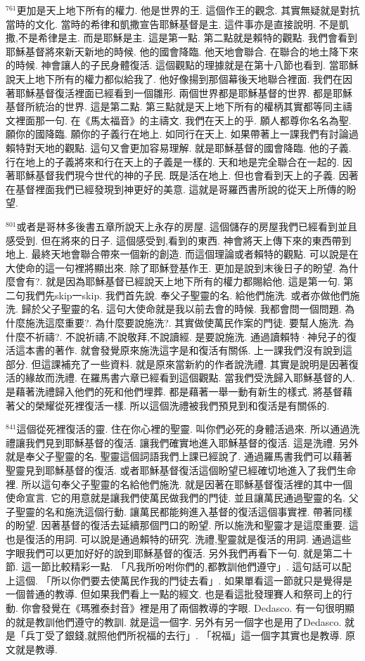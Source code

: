 \documentclass{book}
\begin{document}
$^{761}$更加是天上地下所有的權力.
他是世界的王.
這個作王的觀念.
其實無疑就是對抗當時的文化.
當時的希律和凱撒宣告耶穌基督是主.
這件事亦是直接說明.
不是凱撒,不是希律是主.
而是耶穌是主.
這是第一點.
第二點就是賴特的觀點.
我們會看到耶穌基督將來新天新地的時候.
他的國會降臨.
他天地會聯合.
在聯合的地土降下來的時候.
神會讓人的子民身體復活.
這個觀點的理據就是在第十八節也看到.
當耶穌說天上地下所有的權力都似給我了.
他好像揚到那個幕後天地聯合裡面.
我們在因著耶穌基督復活裡面已經看到一個雛形.
兩個世界都是耶穌基督的世界.
都是耶穌基督所統治的世界.
這是第二點.
第三點就是天上地下所有的權柄其實都等同主禱文裡面那一句.
在《馬太福音》的主禱文.
我們在天上的乎.
願人都尊你名名為聖.
願你的國降臨.
願你的子義行在地上.
如同行在天上.
如果帶著上一課我們有討論過賴特對天地的觀點.
這句又會更加容易理解.
就是耶穌基督的國會降臨.
他的子義.
行在地上的子義將來和行在天上的子義是一樣的.
天和地是完全聯合在一起的.
因著耶穌基督我們現今世代的神的子民.
既是活在地上.
但也會看到天上的子義.
因著在基督裡面我們已經發現到神更好的美意.
這就是哥羅西書所說的從天上所傳的盼望.

$^{801}$或者是哥林多後書五章所說天上永存的房屋.
這個儲存的房屋我們已經看到並且感受到.
但在將來的日子.
這個感受到,看到的東西.
神會將天上傳下來的東西帶到地上.
最終天地會聯合帶來一個新的創造.
而這個理論或者賴特的觀點.
可以說是在大使命的這一句裡將顯出來.
除了耶穌登基作王.
更加是說到末後日子的盼望.
為什麼會有?.
就是因為耶穌基督已經說天上地下所有的權力都賜給他.
這是第一句.
第二句我們先skip一skip.
我們首先說.
奉父子聖靈的名.
給他們施洗.
或者亦做他們施洗.
歸於父子聖靈的名.
這句大使命就是我以前去會的時候.
我都會問一個問題.
為什麼施洗這麼重要?.
為什麼要說施洗?.
其實做使萬民作案的門徒.
要幫人施洗.
為什麼不祈禱?.
不說祈禱,不說敬拜,不說讀經.
是要說施洗.
通過讀賴特·神兒子的復活這本書的著作.
就會發覺原來施洗這字是和復活有關係.
上一課我們沒有說到這部分.
但這課補充了一些資料.
就是原來當新約的作者說洗禮.
其實是說明是因著復活的緣故而洗禮.
在羅馬書六章已經看到這個觀點.
當我們受洗歸入耶穌基督的人.
是藉著洗禮歸入他們的死和他們埋葬.
都是藉著一舉一動有新生的樣式.
將基督藉著父的榮耀從死裡復活一樣.
所以這個洗禮被我們預見到和復活是有關係的.

$^{841}$這個從死裡復活的靈.
住在你心裡的聖靈.
叫你們必死的身體活過來.
所以通過洗禮讓我們見到耶穌基督的復活.
讓我們確實地進入耶穌基督的復活.
這是洗禮.
另外就是奉父子聖靈的名.
聖靈這個詞語我們上課已經說了.
通過羅馬書我們可以藉著聖靈見到耶穌基督的復活.
或者耶穌基督復活這個盼望已經確切地進入了我們生命裡.
所以這句奉父子聖靈的名給他們施洗.
就是因著在耶穌基督復活裡的其中一個使命宣言.
它的用意就是讓我們使萬民做我們的門徒.
並且讓萬民通過聖靈的名.
父子聖靈的名和施洗這個行動.
讓萬民都能夠進入基督的復活這個事實裡.
帶著同樣的盼望.
因著基督的復活去延續那個門口的盼望.
所以施洗和聖靈才是這麼重要.
這也是復活的用詞.
可以說是通過賴特的研究.
洗禮,聖靈就是復活的用詞.
通過這些字眼我們可以更加好好的說到耶穌基督的復活.
另外我們再看下一句.
就是第二十節.
這一節比較精彩一點.
「凡我所吩咐你們的,都教訓他們遵守」.
這句話可以配上這個.
「所以你們要去使萬民作我的門徒去看」.
如果單看這一節就只是覺得是一個普通的教導.
但如果我們看上一點的經文.
也是看這批發理賽人和祭司上的行動.
你會發覺在《瑪雅泰封音》裡是用了兩個教導的字眼.
Dedasco.
有一句很明顯的就是教訓他們遵守的教訓.
就是這一個字.
另外有另一個字也是用了Dedasco.
就是「兵丁受了銀錢,就照他們所祝福的去行」.
「祝福」這一個字其實也是教導.
原文就是教導.
\end{document}
